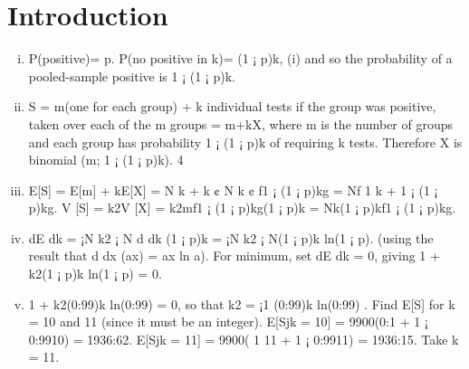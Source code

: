 \documentclass{article}
\begin{document}
\section{Introduction}
\begin{enumerate}[(i)]
\item P(positive)= p. P(no positive in k)= (1 ¡ p)k,
(i) and so the probability of a pooled-sample positive is 1 ¡ (1 ¡ p)k.
\item S = m(one for each group) + k individual tests if the group was positive,
taken over each of the m groups = m+kX, where m is the number of groups
and each group has probability 1 ¡ (1 ¡ p)k of requiring k tests.
Therefore X is binomial (m; 1 ¡ (1 ¡ p)k).
4
\item E[S] = E[m] + kE[X] = N
k + k ¢ N
k ¢ f1 ¡ (1 ¡ p)kg = Nf 1
k + 1 ¡ (1 ¡ p)kg.
V [S] = k2V [X] = k2mf1 ¡ (1 ¡ p)kg(1 ¡ p)k = Nk(1 ¡ p)kf1 ¡ (1 ¡ p)kg.
\item dE
dk = ¡N
k2 ¡ N d
dk (1 ¡ p)k = ¡N
k2 ¡ N(1 ¡ p)k ln(1 ¡ p).
(using the result that d
dx (ax) = ax ln a).
For minimum, set dE
dk = 0, giving 1 + k2(1 ¡ p)k ln(1 ¡ p) = 0.
\item 1 + k2(0:99)k ln(0:99) = 0, so that k2 = ¡1
(0:99)k ln(0:99) .
Find E[S] for k = 10 and 11 (since it must be an integer).
E[Sjk = 10] = 9900(0:1 + 1 ¡ 0:9910) = 1936:62.
E[Sjk = 11] = 9900( 1
11 + 1 ¡ 0:9911) = 1936:15.
Take k = 11.
\end{enumerate}
\end{document}
